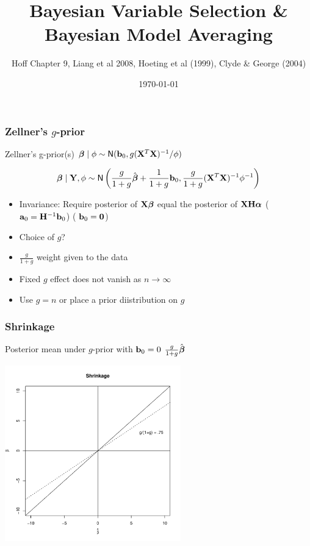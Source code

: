 \documentclass[]{beamer}
\title{Bayesian Variable Selection \&  Bayesian Model Averaging}
\author{Hoff Chapter 9, Liang et al 2008, Hoeting et al (1999), Clyde \&
 George (2004)}
\date{\today}
\begin{document}


\maketitle







\begin{frame}
  \frametitle{Zellner's $g$-prior}
Zellner's g-prior(s) $\boldsymbol{\beta} \mid \phi \sim \textsf{N}(\mathbf{b}_0, g
    (\mathbf{X}^T\mathbf{X})^{-1}/\phi)$ \pause

$$\boldsymbol{\beta} \mid \mathbf{Y}, \phi \sim \textsf{N}\left( \frac{g}{1 + g} \hat{\boldsymbol{\beta}} +  \frac{1}{1 + g}
\mathbf{b}_0, \frac{g}{1 + g} (\mathbf{X}^T\mathbf{X})^{-1} \phi^{-1} \right)$$ \pause

\begin{itemize}
\item Invariance: Require posterior of   $\mathbf{X} \boldsymbol{\beta}$  equal the posterior of $\mathbf{X} \mathbf{H} \boldsymbol{\alpha}$
\pause   ($\mathbf{a}_0 = \mathbf{H}^{-1} \mathbf{b}_0$)  (  $\mathbf{b}_0 = \mathbf{0}$)

\item Choice of $g$?  \pause
\item $\frac{g}{1 + g}$  weight given to the data \pause
\item Fixed $g$ effect does not vanish as $n \to \infty$
\item Use $g = n$ or place a prior diistribution on $g$
\end{itemize}


\end{frame}
\begin{frame}
  \frametitle{Shrinkage}
 Posterior mean under  $g$-prior  with $\mathbf{b}_0 = 0$
$\frac{g}{1 +g} \hat{\boldsymbol{\beta}} $

\centerline{\includegraphics[height=3in]{shrinkage}}
\end{frame}
\end{document}
